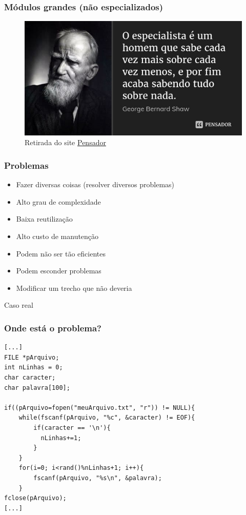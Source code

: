 \begin{frame}
	\frametitle{Módulos grandes (não especializados)}

	\begin{figure}[h]
		\centering
			\includegraphics[height=0.6\paperheight]{figuras/george}
		\caption{Retirada do site \href{https://www.pensador.com/frase/OTMw/}{Pensador}}\label{figure:george}
	\end{figure}

\end{frame}

\begin{frame}
	\frametitle{Problemas}

	\begin{itemize}
		\item Fazer diversas coisas (resolver diversos problemas)
		\item Alto grau de complexidade
		\item Baixa reutilização
		\item Alto custo de manutenção
		\item Podem não ser tão eficientes
		\item Podem esconder problemas
		\item Modificar um trecho que não deveria
	\end{itemize}
\end{frame}

\begin{frame}
	\Huge Caso real
\end{frame}

\begin{frame}[fragile]
	\frametitle{Onde está o problema?}

	\begin{listing}[H]
		\begin{verbatim}
[...]
FILE *pArquivo;
int nLinhas = 0;
char caracter;
char palavra[100];

if((pArquivo=fopen("meuArquivo.txt", "r")) != NULL){
	while(fscanf(pArquivo, "%c", &caracter) != EOF){
		if(caracter == '\n'){
		  nLinhas+=1;
		}
	}
	for(i=0; i<rand()%nLinhas+1; i++){
		fscanf(pArquivo, "%s\n", &palavra);
	}
fclose(pArquivo);
[...]
		\end{verbatim}
	\end{listing}

\end{frame}

